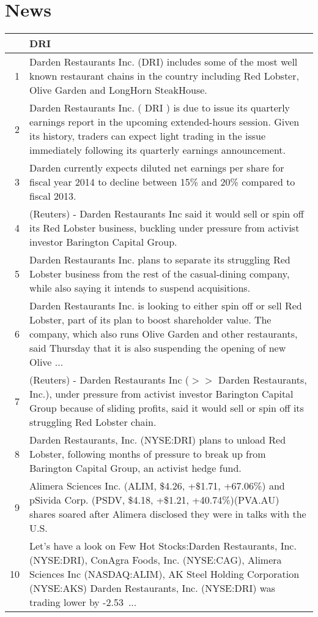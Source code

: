 \documentclass{tufte-handout}\usepackage[]{graphicx}\usepackage[]{color}
\begin{document}
\newpage
\section{News}


\begin{tabularx}{\textwidth}{rX}
  \hline
 & DRI \\ 
  \hline
1 &  Darden Restaurants Inc. (DRI) includes some of the most well known restaurant chains in the country including Red Lobster, Olive Garden and LongHorn SteakHouse.  \\ 
  2 &  Darden Restaurants Inc. ( DRI ) is due to issue its quarterly earnings report in the upcoming extended-hours session. Given its history, traders can expect light trading in the issue immediately following its quarterly earnings announcement.  \\ 
  3 &  Darden currently expects diluted net earnings per share for fiscal year 2014 to decline between 15\% and 20\% compared to fiscal 2013.  \\ 
  4 &  (Reuters) - Darden Restaurants Inc said it would sell or spin off its Red Lobster business, buckling under pressure from activist investor Barington Capital Group.  \\ 
  5 &  Darden Restaurants Inc. plans to separate its struggling Red Lobster business from the rest of the casual-dining company, while also saying it intends to suspend acquisitions.  \\ 
  6 &  Darden Restaurants Inc. is looking to either spin off or sell Red Lobster, part of its plan to boost shareholder value. The company, which also runs Olive Garden and other restaurants, said Thursday that it is also suspending the opening of new Olive ...  \\ 
  7 &  (Reuters) - Darden Restaurants Inc ($>$$>$ Darden Restaurants, Inc.), under pressure from activist investor Barington Capital Group because of sliding profits, said it would sell or spin off its struggling Red Lobster chain.  \\ 
  8 &  Darden Restaurants, Inc. (NYSE:DRI) plans to unload Red Lobster, following months of pressure to break up from Barington Capital Group, an activist hedge fund.  \\ 
  9 &  Alimera Sciences Inc. (ALIM, \$4.26, +\$1.71, +67.06\%) and pSivida Corp. (PSDV, \$4.18, +\$1.21, +40.74\%)(PVA.AU) shares soared after Alimera disclosed they were in talks with the U.S.  \\ 
  10 &  Let's have a look on Few Hot Stocks:Darden Restaurants, Inc. (NYSE:DRI), ConAgra Foods, Inc. (NYSE:CAG), Alimera Sciences Inc (NASDAQ:ALIM), AK Steel Holding Corporation (NYSE:AKS) Darden Restaurants, Inc. (NYSE:DRI) was trading lower by -2.53 ...  \\ 
   \hline
\end{tabularx}
\end{document}
